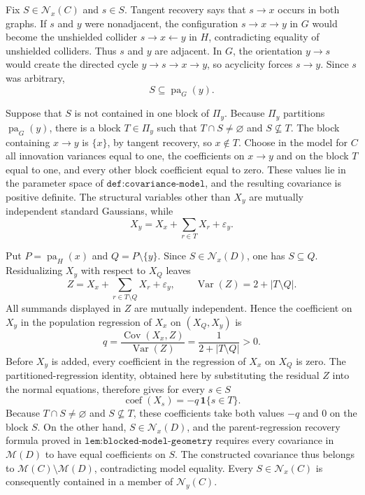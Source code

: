 Fix \(S\in\mathcal N_x(C)\) and \(s\in S\). Tangent recovery says that \(s\to x\) occurs in both graphs. If \(s\) and \(y\) were nonadjacent, the configuration \(s\to x\to y\) in \(G\) would become the unshielded collider \(s\to x\leftarrow y\) in \(H\), contradicting equality of unshielded colliders. Thus \(s\) and \(y\) are adjacent. In \(G\), the orientation \(y\to s\) would create the directed cycle \(y\to s\to x\to y\), so acyclicity forces \(s\to y\). Since \(s\) was arbitrary,
\[
 S\subseteq\operatorname{pa}_G(y).
\]

Suppose that \(S\) is not contained in one block of \(\Pi_y\). Because \(\Pi_y\) partitions \(\operatorname{pa}_G(y)\), there is a block \(T\in\Pi_y\) such that \(T\cap S\neq\varnothing\) and \(S\nsubseteq T\). The block containing \(x\to y\) is \(\{x\}\), by tangent recovery, so \(x\notin T\). Choose in the model for \(C\) all innovation variances equal to one, the coefficients on \(x\to y\) and on the block \(T\) equal to one, and every other block coefficient equal to zero. These values lie in the parameter space of \(\texttt{def:covariance-model}\), and the resulting covariance is positive definite. The structural variables other than \(X_y\) are mutually independent standard Gaussians, while
\[
 X_y=X_x+\sum_{r\in T}X_r+\varepsilon_y.
\]

Put \(P=\operatorname{pa}_H(x)\) and \(Q=P\setminus\{y\}\). Since \(S\in\mathcal N_x(D)\), one has \(S\subseteq Q\). Residualizing \(X_y\) with respect to \(X_Q\) leaves
\[
 Z=X_x+\sum_{r\in T\setminus Q}X_r+\varepsilon_y,
 \qquad
 \operatorname{Var}(Z)=2+|T\setminus Q|.
\]
All summands displayed in \(Z\) are mutually independent. Hence the coefficient on \(X_y\) in the population regression of \(X_x\) on \((X_Q,X_y)\) is
\[
 q=\frac{\operatorname{Cov}(X_x,Z)}{\operatorname{Var}(Z)}
 =\frac{1}{2+|T\setminus Q|}>0.
\]
Before \(X_y\) is added, every coefficient in the regression of \(X_x\) on \(X_Q\) is zero. The partitioned-regression identity, obtained here by substituting the residual \(Z\) into the normal equations, therefore gives for every \(s\in S\)
\[
 \operatorname{coef}(X_s)=-q\,\mathbf 1\{s\in T\}.
\]
Because \(T\cap S\neq\varnothing\) and \(S\nsubseteq T\), these coefficients take both values \(-q\) and \(0\) on the block \(S\). On the other hand, \(S\in\mathcal N_x(D)\), and the parent-regression recovery formula proved in \(\texttt{lem:blocked-model-geometry}\) requires every covariance in \(\mathcal M(D)\) to have equal coefficients on \(S\). The constructed covariance thus belongs to \(\mathcal M(C)\setminus\mathcal M(D)\), contradicting model equality. Every \(S\in\mathcal N_x(C)\) is consequently contained in a member of \(\mathcal N_y(C)\).

